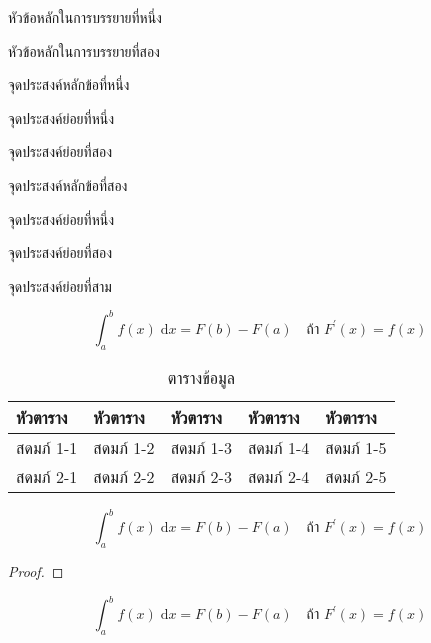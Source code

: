 \begin{preview}
	\item หัวข้อหลักในการบรรยายที่หนึ่ง
	\item หัวข้อหลักในการบรรยายที่สอง
\end{preview}
\begin{objective}
\item จุดประสงค์หลักข้อที่หนึ่ง
		\begin{subobjective}
			\item จุดประสงค์ย่อยที่หนึ่ง
			\item จุดประสงค์ย่อยที่สอง
		\end{subobjective}
\item จุดประสงค์หลักข้อที่สอง
		\begin{subobjective}
			\item จุดประสงค์ย่อยที่หนึ่ง
			\item จุดประสงค์ย่อยที่สอง
			\item จุดประสงค์ย่อยที่สาม
		\end{subobjective}
\end{objective}
\begin{content}
\begin{equation}
	\int_{a}^{b} f(x) \;\mathrm{d}x = F(b) - F(a) \quad\text{ถ้า }F^\prime(x) = f(x)
\end{equation}

\begin{table}[h]
\centering
\begin{tabular}{|l|l|l|l|l|}
\hline
หัวตาราง & หัวตาราง & หัวตาราง & หัวตาราง & หัวตาราง \\ \hline
สดมภ์ 1-1 & สดมภ์ 1-2 & สดมภ์ 1-3 & สดมภ์ 1-4 & สดมภ์ 1-5  \\ \hline 	
สดมภ์ 2-1 & สดมภ์ 2-2 & สดมภ์ 2-3 & สดมภ์ 2-4 & สดมภ์ 2-5  \\ \hline 
\end{tabular}
\caption{ตารางข้อมูล}	
\end{table}
\begin{theorem}
\begin{equation}
	\int_{a}^{b} f(x) \;\mathrm{d}x = F(b) - F(a) \quad\text{ถ้า }F^\prime(x) = f(x)
\end{equation}
\end{theorem}
\begin{proof}
\end{proof}

\begin{example}
\begin{equation}
	\int_{a}^{b} f(x) \;\mathrm{d}x = F(b) - F(a) \quad\text{ถ้า }F^\prime(x) = f(x)
\end{equation}
\end{example}

\end{content}

